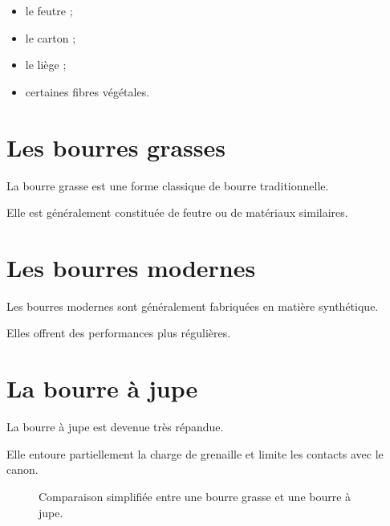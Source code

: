 \begin{itemize}
    \item le feutre ;
    \item le carton ;
    \item le liège ;
    \item certaines fibres végétales.
\end{itemize}

\section{Les bourres grasses}

La bourre grasse est une forme classique de bourre traditionnelle.

Elle est généralement constituée de feutre ou de matériaux similaires.

\section{Les bourres modernes}

Les bourres modernes sont généralement fabriquées en matière synthétique.

Elles offrent des performances plus régulières.

\section{La bourre à jupe}

La bourre à jupe est devenue très répandue.

Elle entoure partiellement la charge de grenaille et limite les contacts avec
le canon.

\begin{figure}[htbp]
\centering


\caption{Comparaison simplifiée entre une bourre grasse et une bourre à jupe.}
\label{fig:bourre_grasse_jupe}

\end{figure}

